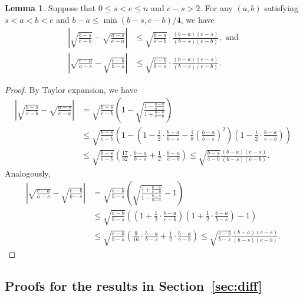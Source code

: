 \documentclass[11pt, a4paper]{article}
\renewcommand{\l}{\left}
\renewcommand{\r}{\right}
\theoremstyle{definition}
\theoremstyle{definition}
\theoremstyle{definition}
\newtheorem{lem}[thm]{Lemma}
\theoremstyle{definition}
\theoremstyle{definition}
\theoremstyle{remark}
\theoremstyle{definition}
\theoremstyle{definition}
\theoremstyle{definition}
\begin{document}
\begin{lem}
	\label{lem:sqrt:diff}
	Suppose that $0 \le s < e \le n$ and $e - s > 2$. For any $(a, b)$ satisfying $s < a < b < e$ and $b - a \le \min(b - s, e - b)/4$, we have 
	\begin{align*}
	\l\vert \sqrt{\frac{b - s}{e - b}} - \sqrt{\frac{a - s}{e - a}} \r\vert &\le \sqrt{\frac{b - s}{e - b}} \cdot \frac{(b - a)(e - s)}{(b - s)(e - b)}, \text{ \ and}
	\\
	\l\vert \sqrt{\frac{e - a}{a - s}} - \sqrt{\frac{e - b}{b - s}} \r\vert &\le \sqrt{\frac{e - b}{b - s}} \cdot \frac{(b - a)(e - s)}{(b - s)(e - b)}.
	\end{align*}
\end{lem}
\begin{proof}
	By Taylor expansion, we have
	\begin{align*}
	\l\vert \sqrt{\frac{b - s}{e - b}} - \sqrt{\frac{a - s}{e - a}} \r\vert &= \sqrt{\frac{b - s}{e - b}} \l( 1 - \sqrt{\frac{1 - \frac{b - a}{b - s}}{1 + \frac{b - a}{e - b}}} \r)
	\\
	&\le \sqrt{\frac{b - s}{e - b}} \l( 1 - \l(1 - \frac{1}{2} \cdot \frac{b - a}{b - s} - \frac{1}{8} \l( \frac{b - a}{b - s} \r)^2 \r) \l( 1 - \frac{1}{2} \cdot \frac{b - a}{e - b} \r) \r)
	\\
	&\le \sqrt{\frac{b - s}{e - b}} \l( \frac{17}{32} \cdot \frac{b - a}{b - s} + \frac{1}{2} \cdot \frac{b - a}{e - b}  \r) \le \sqrt{\frac{b - s}{e - b}} \frac{(b - a)(e - s)}{(b - s) (e - b)}.
	\end{align*}
	Analogously,
	\begin{align*}
	\l\vert \sqrt{\frac{e - a}{a - s}} - \sqrt{\frac{e - b}{b - s}} \r\vert &= \sqrt{\frac{e - b}{b - s}} \l( \sqrt{\frac{1 + \frac{b - a}{e - b}}{1 - \frac{b - a}{b - s}}} - 1 \r)
	\\
	&\le \sqrt{\frac{e - b}{b - s}} \l(\l( 1 + \frac{1}{2} \cdot \frac{b - a}{e - b} \r) \l(1 + \frac{1}{2} \cdot \frac{b - a}{b - s} \r) - 1\r)
	\\
	&\le \sqrt{\frac{e - b}{b - s}} \l( \frac{9}{16} \cdot \frac{b - a}{b - s} + \frac{1}{2} \cdot \frac{b - a}{e - b}  \r) \le \sqrt{\frac{e - b}{b - s}} \frac{(b - a)(e - s)}{(b - s) (e - b)}.
	\end{align*}
\end{proof}

\subsection{Proofs for the results in Section~\ref{sec:diff}}
\end{document}
